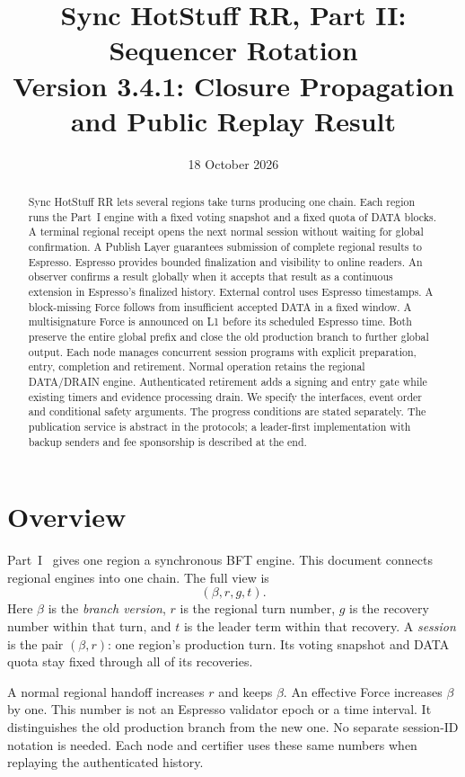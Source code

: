 \documentclass[11pt,a4paper]{article}
\title{Sync HotStuff RR, Part II: Sequencer Rotation\\\large Version 3.4.1: Closure Propagation and Public Replay Result}
\author{}\date{18 October 2026}
\newcommand{\defterm}[1]{\textcolor{rrBlue}{\textit{#1}}}
\newcounter{protocol}
\begin{document}
\maketitle
\begin{abstract}
Sync HotStuff RR lets several regions take turns producing one chain.
Each region runs the Part~I engine with a fixed voting snapshot and a
fixed quota of DATA blocks. A terminal regional receipt opens the next
normal session without waiting for global confirmation. A Publish Layer
guarantees submission of complete regional results to Espresso. Espresso
provides bounded finalization and visibility to online readers. An observer confirms a result
globally when it accepts that result as a continuous extension in
Espresso's finalized history. External control uses Espresso timestamps.
A block-missing Force follows from insufficient accepted DATA in a fixed
window. A multisignature Force is announced on L1 before its scheduled
Espresso time. Both preserve the entire global prefix and close the old
production branch to further global output. Each node manages concurrent session programs with explicit preparation,
entry, completion and retirement. Normal operation retains the regional
DATA/DRAIN engine. Authenticated retirement adds a signing and entry gate
while existing timers and evidence processing drain. We specify the
interfaces, event order and conditional safety arguments.
The progress conditions are stated separately. The publication service is
abstract in the protocols; a leader-first implementation with backup
senders and fee sponsorship is described at the end.
\end{abstract}

\section{Overview}
\label{sec:overview}
Part~I~\cite{part1} gives one region a synchronous BFT engine.
This document connects regional engines into one chain. The full view is
\[
 (\beta,r,g,t).
\]
Here $\beta$ is the \defterm{branch version}, $r$ is the regional turn
number, $g$ is the recovery number within that turn, and $t$ is the
leader term within that recovery. A \defterm{session} is the pair
$(\beta,r)$: one region's production turn. Its voting snapshot and DATA
quota stay fixed through all of its recoveries.

A normal regional handoff increases $r$ and keeps $\beta$.
An effective Force increases $\beta$ by one. This number is not an
Espresso validator epoch or a time interval. It distinguishes the old
production branch from the new one. No separate session-ID notation is
needed. Each node and certifier uses these same numbers when replaying
the authenticated history.
\end{document}
